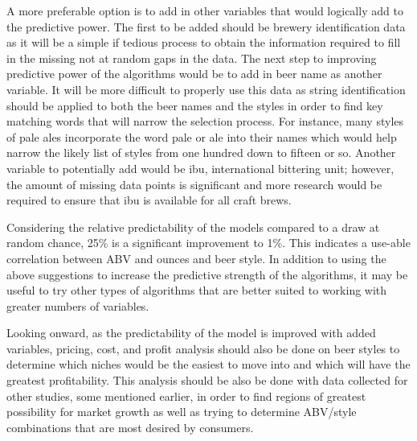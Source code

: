 \documentclass[12pt,english]{article}
\begin{document}
A more preferable option is to add in other variables that would logically add to the predictive power.  The first to be added should be brewery identification data as it will be a simple if tedious process to obtain the information required to fill in the missing not at random gaps in the data.  The next step to improving predictive power of the algorithms would be to add in beer name as another variable.  It will be more difficult to properly use this data as string identification should be applied to both the beer names and the styles in order to find key matching words that will narrow the selection process.  For instance, many styles of pale ales incorporate the word pale or ale into their names which would help narrow the likely list of styles from one hundred down to fifteen or so.  Another variable to potentially add would be ibu, international bittering unit; however, the amount of missing data points is significant and more research would be required to ensure that ibu is available for all craft brews.

Considering the relative predictability of the models compared to a draw at random chance, 25\% is a significant improvement to 1\%.  This indicates a use-able correlation between ABV and ounces and beer style.  In addition to using the above suggestions to increase the predictive strength of the algorithms, it may be useful to try other types of algorithms that are better suited to working with greater numbers of variables.

Looking onward, as the predictability of the model is improved with added variables, pricing, cost, and profit analysis should also be done on beer styles to determine which niches would be the easiest to move into and which will have the greatest profitability.  This analysis should be also be done with data collected for other studies, some mentioned earlier, in order to find regions of greatest possibility for market growth as well as trying to determine ABV/style combinations that are most desired by consumers.

\vfill
\pagebreak{}
\begin{spacing}{1.0}



\end{spacing}

\vfill
\pagebreak{}
\clearpage

\end{document}
